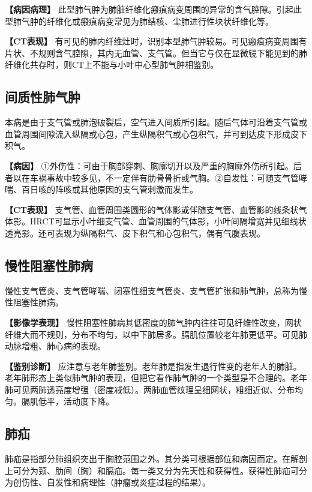 \textbf{【病因病理】}
此型肺气肿为肺脏纤维化瘢痕病变周围的异常的含气腔隙。引起此型肺气肿的纤维化或瘢痕病变常见为肺结核、尘肺进行性块状纤维化等。

\textbf{【CT表现】}
有可见的肺内纤维灶时，识别本型肺气肿较易。可见瘢痕病变周围有片状、不规则含气腔隙，其内无血管、支气管。但当它与仅在显微镜下能见到的肺纤维化共存时，则CT上不能与小叶中心型肺气肿相鉴别。

\subsection{间质性肺气肿}

本病是由于支气管或肺泡破裂后，空气进入间质所引起。随后气体可沿着支气管或血管周围间隙流入纵隔或心包，产生纵隔积气或心包积气，并可到达皮下形成皮下积气。

\textbf{【病因】}
①外伤性：可由于胸部穿刺、胸廓切开以及严重的胸廓外伤所引起。后者以在车祸事故中较多见，不一定伴有肋骨骨折或气胸。②自发性：可随支气管哮喘、百日咳的阵咳或其他原因的支气管刺激而发生。

\textbf{【CT表现】}
支气管、血管周围类圆形的气体影或伴随支气管、血管影的线条状气体影。HRCT可显示小叶细支气管、血管周围的气体影，小叶间隔增宽并见细线状透亮影。还可表现为纵隔积气、皮下积气和心包积气，偶有气腹表现。

\subsection{慢性阻塞性肺病}

慢性支气管炎、支气管哮喘、闭塞性细支气管炎、支气管扩张和肺气肿，总称为慢性阻塞性肺病。

\textbf{【影像学表现】}
慢性阻塞性肺病其低密度的肺气肿内往往可见纤维性改变，网状纤维大而不规则，分布不均匀，以中下肺居多。膈肌位置较老年肺更低平。可见肺动脉增粗、肺心病的表现。

\textbf{【鉴别诊断】}
应注意与老年肺鉴别。老年肺是指发生退行性变的老年人的肺脏。老年肺形态上类似肺气肿的表现，但把它看作肺气肿的一个类型是不合理的。老年肺可见两肺透亮度增强（密度减低）。两肺血管纹理呈细网状，粗细近似、分布均匀。膈肌低平，活动度下降。

\subsection{肺疝}

肺疝是指部分肺组织突出于胸腔范围之外。其分类可根据部位和病因而定。在解剖上可分为颈、肋间（胸）和膈疝。每一类又分为先天性和获得性。获得性肺疝可分为创伤性、自发性和病理性（肿瘤或炎症过程的结果）。

